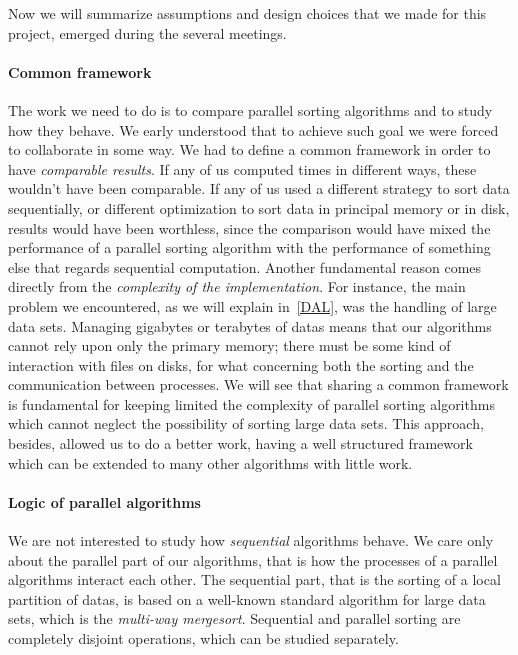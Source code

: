 Now we will summarize assumptions and design choices that we made for this project, emerged during the several meetings. 

\paragraph{Common framework} The work we need to do is to compare parallel sorting algorithms and to study how they behave. We early understood that to achieve such goal we were forced to collaborate in some way. We had to define a common framework in order to have \textit{comparable results}. If any of us computed times in different ways, these wouldn't have been comparable. If any of us used a different strategy to sort data sequentially, or different optimization to sort data in principal memory or in disk, results would have been worthless, since the comparison would have mixed the performance of a parallel sorting algorithm with the performance of something else that regards sequential computation. Another fundamental reason comes directly from the \textit{complexity of the implementation}. For instance, the main problem we encountered, as we will explain in~\ref{DAL}, was the handling of large data sets. Managing gigabytes or terabytes of datas means that our algorithms cannot rely upon only the primary memory; there must be some kind of interaction with files on disks, for what concerning both the sorting and the communication between processes. We will see that sharing a common framework is fundamental for keeping limited the complexity of parallel sorting algorithms which cannot neglect the possibility of sorting large data sets. This approach, besides, allowed us to do a better work, having a well structured framework which can be extended to many other algorithms with little work.

\paragraph{Logic of parallel algorithms} We are not interested to study how \textit{sequential} algorithms behave. We care only about the parallel part of our algorithms, that is how the processes of a parallel algorithms interact each other. The sequential part, that is the sorting of a local partition of datas, is based on a well-known standard algorithm for large data sets, which is the \textit{multi-way mergesort}. Sequential and parallel sorting are completely disjoint operations, which can be studied separately.

